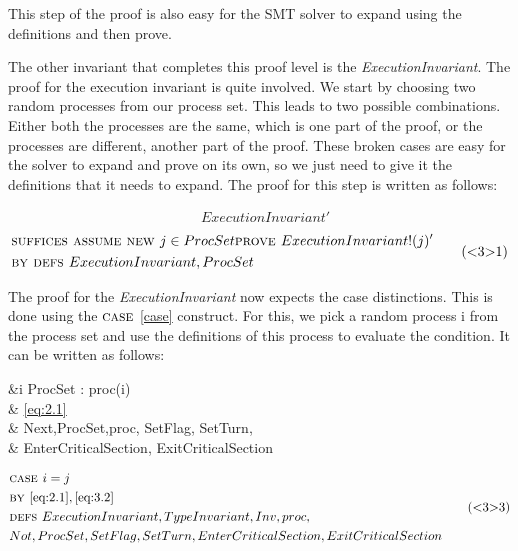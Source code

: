\documentclass[fleqn]{tukseminar}
\begin{document}
			This step of the proof is also easy for the SMT solver to expand using the definitions and then prove.
			
			The other invariant that completes this proof level is the \textit{ExecutionInvariant}. The proof for the execution invariant is quite involved. We start by choosing two random processes from our process set. This leads to two possible combinations. Either both the processes are the same, which is one part of the proof, or the processes are different, another part of the proof. These broken cases are easy for the solver to expand and prove on its own, so we just need to give it the definitions that it needs to expand. The proof for this step is written as follows:
			
			\begin{equation}\label{eq:2.3}
				\begin{aligned}
					& ExecutionInvariant'
				\end{aligned}
				\tag{<2>3}
			\end{equation}
			\begin{equation}\label{eq:3.1}
				\begin{aligned}
					& \textsc{suffices } \textsc{assume } \textsc{new } j \in ProcSet \textsc{prove } ExecutionInvariant!(j)'\\
					& \textsc{by } \textsc{defs } ExecutionInvariant, ProcSet
				\end{aligned}
				\tag{<3>1}
			\end{equation}
			
			The proof for the \textit{ExecutionInvariant} now expects the case distinctions. This is done using the $\textsc{case }$\ref{case} construct. For this, we pick a random process i from the process set and use the definitions of this process to evaluate the condition. It can be written as follows:
			
			\begin{flalign} \label{eq:3.2}
				\begin{aligned}
					&\PICK i \in ProcSet : proc(i) \\
					&  \BY \ref{eq:2.1} \\
					& \DEFS Next,ProcSet,proc, SetFlag, SetTurn, \\
					& EnterCriticalSection, ExitCriticalSection
				\end{aligned}
				\tag{<3>2}
			\end{flalign}
			
			\begin{equation} \label{eq:3.3}
				\begin{aligned}
					& \textsc{case } i = j\\
					& \textsc{by } \ref{eq:2.1}, \ref{eq:3.2}\\
					& \textsc{defs } ExecutionInvariant, TypeInvariant, Inv, proc, \\
					& Not,ProcSet, SetFlag, SetTurn, EnterCriticalSection, ExitCriticalSection
				\end{aligned}
				\tag{<3>3}
			\end{equation}
			
\end{document}
